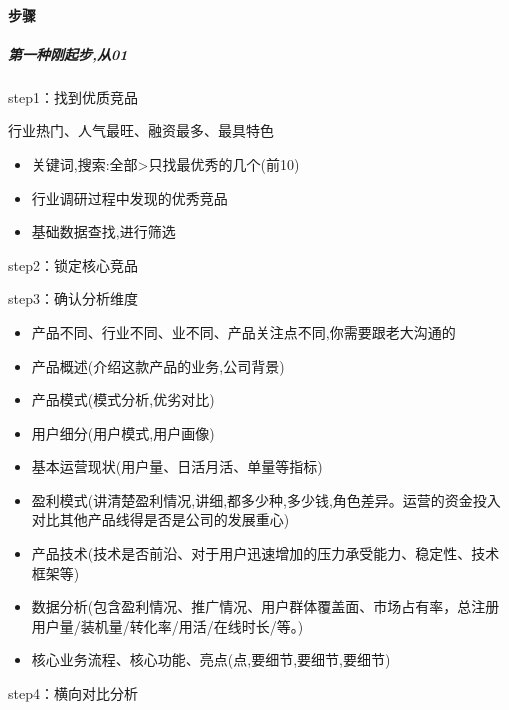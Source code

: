 \documentclass[letterpaper,11pt,english]{sphinxmanual}
\begin{document}
\paragraph{步骤}
\label{\detokenize{chapter_knowledge/goods_analysis:id21}}

\subparagraph{第一种刚起步,从0\sphinxhyphen{}1}
\label{\detokenize{chapter_knowledge/goods_analysis:id22}}
step1：找到优质竞品

行业热门、人气最旺、融资最多、最具特色
\begin{itemize}
\item {} 
关键词,搜索:全部>只找最优秀的几个(前10)

\item {} 
行业调研过程中发现的优秀竞品

\item {} 
基础数据查找,进行筛选

\end{itemize}

step2：锁定核心竞品

step3：确认分析维度
\begin{itemize}
\item {} 
产品不同、行业不同、业不同、产品关注点不同,你需要跟老大沟通的

\item {} 
产品概述(介绍这款产品的业务,公司背景)

\item {} 
产品模式(模式分析,优劣对比)

\item {} 
用户细分(用户模式,用户画像)

\item {} 
基本运营现状(用户量、日活月活、单量等指标)

\item {} 
盈利模式(讲清楚盈利情况,讲细,都多少种,多少钱,角色差异。运营的资金投入对比其他产品线得是否是公司的发展重心)

\item {} 
产品技术(技术是否前沿、对于用户迅速增加的压力承受能力、稳定性、技术框架等)

\item {} 
数据分析(包含盈利情况、推广情况、用户群体覆盖面、市场占有率，总注册用户量/装机量/转化率/用活/在线时长/等。)

\item {} 
核心业务流程、核心功能、亮点(点,要细节,要细节,要细节)

\end{itemize}

step4：横向对比分析
\end{document}
